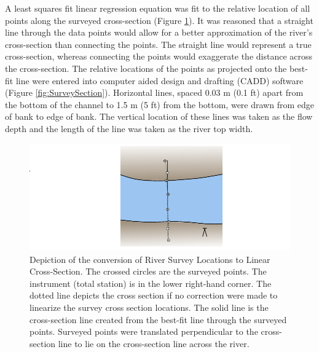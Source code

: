 A least squares fit linear regression equation was fit to the relative location of all points along the surveyed cross-section (Figure \ref{fig:SurveyPlanView}).  It was reasoned that a straight line through the data points would allow for a better approximation of the river's cross-section than connecting the points.  The straight line would represent a true cross-section, whereas connecting the points would exaggerate the distance across the cross-section.  The relative locations of the points as projected onto the best-fit line were entered into computer aided design and drafting (CADD) software (Figure \ref{fig:SurveySection}).  Horizontal lines, spaced 0.03 m (0.1 ft) apart from the bottom of the channel to 1.5 m (5 ft) from the bottom, were drawn from edge of bank to edge of bank.  The vertical location of these lines was taken as the flow depth and the length of the line was taken as the river top width.

\begin{figure}[htbp]
\centering
	\includegraphics[width=6in]{Figures/LineDiagram/SurveyPlanView}
	\caption[Depiction of the conversion of River Survey Locations to Linear Cross-Section.]{Depiction of the conversion of River Survey Locations to Linear Cross-Section.  The crossed circles are the surveyed points.  The instrument (total station) is in the lower right-hand corner.  The dotted line depicts the cross section if no correction were made to linearize the survey cross section locations.  The solid line is the cross-section line created from the best-fit line through the surveyed points.  Surveyed points were translated perpendicular to the cross-section line to lie on the cross-section line across the river.}
	\label{fig:SurveyPlanView}
\end{figure}


